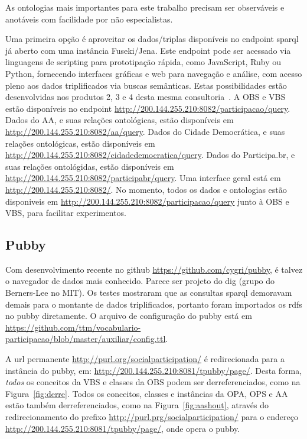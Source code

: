 \documentclass[12pt]{article}
\begin{document}
As ontologias mais importantes para este trabalho precisam ser observáveis e anotáveis com facilidade por não especialistas.

Uma primeira opção é aproveitar os dados/triplas disponíveis no endpoint sparql já aberto com uma instância Fuseki/Jena. Este endpoint pode ser acessado via linguagens de scripting para prototipação rápida, como JavaScript, Ruby ou Python, fornecendo interfaces gráficas e web para navegação e análise, com acesso pleno aos dados triplificados via buscas semânticas. Estas possibilidades estão desenvolvidas nos produtos 2, 3 e 4 desta mesma consultoria~\cite{repoProd2, repoProd3, repoProd4}. A OBS e VBS estão disponíveis no endpoint \url{http://200.144.255.210:8082/participacao/query}. Dados do AA, e suas relações ontológicas, estão disponíveis em \url{http://200.144.255.210:8082/aa/query}. Dados do Cidade Democrática, e suas relações ontológicas, estão disponíveis em \url{http://200.144.255.210:8082/cidadedemocratica/query}. Dados do Participa.br, e suas relações ontológidas, estão disponíveis em \url{http://200.144.255.210:8082/participabr/query}. Uma interface geral está em \url{http://200.144.255.210:8082/}. No momento, todos os dados e ontologias estão disponiveis em  \url{http://200.144.255.210:8082/participacao/query} junto à OBS e VBS, para facilitar experimentos.

\subsection{Pubby}
Com desenvolvimento recente no github \url{https://github.com/cygri/pubby}, é talvez o navegador de dados mais conhecido. Parece ser projeto do dig (grupo do Berners-Lee no MIT).
Os testes mostraram que as consultas sparql demoravam demais para o montante de dados triplificados, portanto foram importados os rdfs no pubby diretamente. O arquivo de configuração do pubby está em \url{https://github.com/ttm/vocabulario-participacao/blob/master/auxiliar/config.ttl}.

A url permanente \url{http://purl.org/socialparticipation/} é redirecionada para a instância do pubby, em: \url{http://200.144.255.210:8081/tpubby/page/}. Desta forma, \emph{todos} os conceitos da VBS e classes da OBS podem ser derreferenciados, como na Figura~\ref{fig:derre}. Todos os conceitos, classes e instâncias da OPA, OPS e AA estão também derreferenciados, como na Figura~\ref{fig:aashout}, através do redirecionamento do prefixo \url{http://purl.prg/socialparticipation/} para o endereço \url{http://200.144.255.210:8081/tpubby/page/}, onde opera o pubby.
\end{document}
